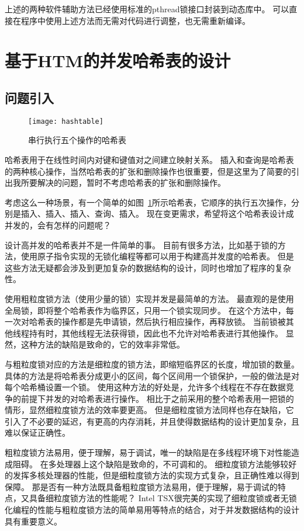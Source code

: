 上述的两种软件辅助方法已经使用标准的pthread锁接口封装到动态库中。
可以直接在程序中使用上述方法而无需对代码进行调整，也无需重新编译。


\section{基于HTM的并发哈希表的设计}

\subsection{问题引入}

\begin{figure}[htbp]
\centering
\texttt{[image: hashtable]}
\caption{串行执行五个操作的哈希表}\label{fig:hashtable}
\end{figure}

哈希表用于在线性时间内对键和键值对之间建立映射关系。
插入和查询是哈希表的两种核心操作，当然哈希表的扩张和删除操作也很重要，但是这里为了简要的引出我所要解决的问题，暂时不考虑哈希表的扩张和删除操作。

考虑这么一种场景，有一个简单的如图~\ref{fig:hashtable}所示哈希表，它顺序的执行五次操作，分别是插入、插入、插入、查询、插入。
现在变更需求，希望将这个哈希表设计成并发的，会有怎样的问题呢？

设计高并发的哈希表并不是一件简单的事。
目前有很多方法，比如基于锁的方法，使用原子指令实现的无锁化编程等都可以用于构建高并发度的哈希表。
但是这些方法无疑都会涉及到更加复杂的数据结构的设计，同时也增加了程序的复杂性。

使用粗粒度锁方法（使用少量的锁）实现并发是最简单的方法。
最直观的是使用全局锁，即将整个哈希表作为临界区，只用一个锁实现同步。
在这个方法中，每一次对哈希表的操作都是先申请锁，然后执行相应操作，再释放锁。
当前锁被其他线程持有时，其他线程无法获得锁，因此也不允许对哈希表进行其他操作。
显然，这种方法的缺陷是致命的，它的效率非常低。

与粗粒度锁对应的方法是细粒度的锁方法，即缩短临界区的长度，增加锁的数量。
具体的方法是将哈希表分成更小的区间，每个区间用一个锁保护，一般的做法是对每个哈希桶设置一个锁。
使用这种方法的好处是，允许多个线程在不存在数据竞争的前提下并发的对哈希表进行操作。
相比于之前采用的整个哈希表用一把锁的情形，显然细粒度锁方法的效率要更高。
但是细粒度锁方法同样也存在缺陷，它引入了不必要的延迟，有更高的内存消耗，并且使得数据结构的设计更加复杂，且难以保证正确性。

粗粒度锁方法易用，便于理解，易于调试，唯一的缺陷是在多线程环境下对性能造成阻碍。
在多处理器上这个缺陷是致命的，不可调和的。
细粒度锁方法能够较好的发挥多核处理器的性能，但是细粒度锁方法的实现方式复杂，且正确性难以得到保障。
那是否有一种方法既具备粗粒度锁方法易用，便于理解，易于调试的特点，又具备细粒度锁方法的性能呢？
Intel TSX很完美的实现了细粒度锁或者无锁化编程的性能与粗粒度锁方法的简单易用等特点的结合，对于并发数据结构的设计具有重要意义。

